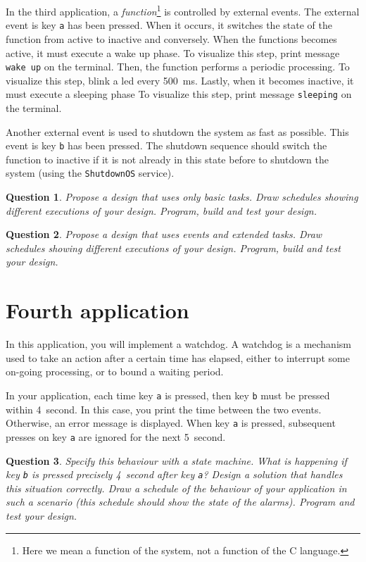 \documentclass[11pt]{report}
\newtheorem{ex}{Question}
\begin{document}
In the third application, a \textit{function}\footnote{Here we mean a function of the system, not a function of the C language.} is controlled by external events.
The external event is key \verb-a- has been pressed.
When it occurs, it switches the state of the function from active to inactive and conversely.
When the functions becomes active, it must execute a wake up phase.
To visualize this step, print message \verb-wake up- on the terminal.
Then, the function performs a periodic processing.
To visualize this step, blink a led every \SI{500}{\milli\second}.
Lastly, when it becomes inactive, it must execute a sleeping phase
To visualize this step, print message \verb-sleeping- on the terminal.

Another external event is used to shutdown the system as fast as possible.
This event is key \verb-b- has been pressed.
The shutdown sequence should switch the function to inactive if it is not already in this state before to shutdown the system (using the \texttt{ShutdownOS} service).

\begin{ex}
  Propose a design that uses only basic tasks.
  Draw schedules showing different executions of your design.
  Program, build and test your design.
\end{ex}

\begin{ex}
  Propose a design that uses events and extended tasks.
  Draw schedules showing different executions of your design.
  Program, build and test your design.
\end{ex}

\section{Fourth application}

In this application, you will implement a watchdog.
A watchdog is a mechanism used to take an action after a certain time has elapsed, either to interrupt some on-going processing, or to bound a waiting period.

In your application, each time key \verb-a- is pressed, then key \verb-b- must be pressed within \SI{4}{second}.
In this case, you print the time between the two events.
Otherwise, an error message is displayed.
When key \verb-a- is pressed, subsequent presses on key \verb-a- are ignored for the next \SI{5}{second}.

\begin{ex}
  Specify this behaviour with a state machine.
  What is happening if key \verb-b- is pressed precisely \SI{4}{second} after key \verb-a-?
  Design a solution that handles this situation correctly.
  Draw a schedule of the behaviour of your application in such a scenario (this schedule should show the state of the alarms).
  Program and test your design.
\end{ex}
\end{document}
